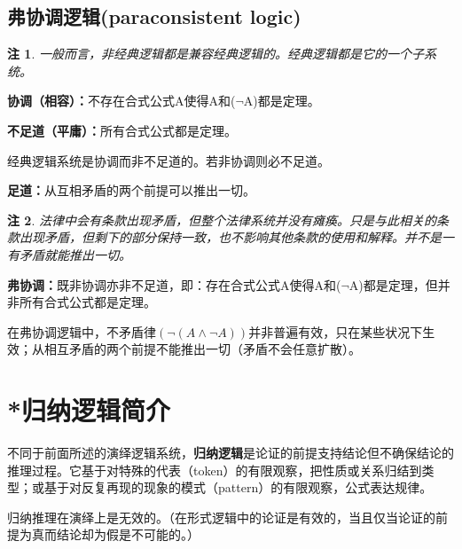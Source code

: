 \documentclass[12pt,onecolumn,a4paper]{book}
\newtheorem*{note}{注}
\numberwithin{table}{subsection}
\numberwithin{equation}{subsection}
\begin{document}
\section{弗协调逻辑(paraconsistent logic)}

\begin{note}
    一般而言，非经典逻辑都是兼容经典逻辑的。经典逻辑都是它的一个子系统。
\end{note}

\textbf{协调（相容）：}不存在合式公式A使得A和($\neg$A)都是定理。

\textbf{不足道（平庸）：}所有合式公式都是定理。

经典逻辑系统是协调而非不足道的。若非协调则必不足道。

\textbf{足道：}从互相矛盾的两个前提可以推出一切。


\begin{note}
    法律中会有条款出现矛盾，但整个法律系统并没有瘫痪。只是与此相关的条款出现矛盾，但剩下的部分保持一致，也不影响其他条款的使用和解释。并不是一有矛盾就能推出一切。
\end{note}

\textbf{弗协调：}既非协调亦非不足道，即：存在合式公式A使得A和($\neg$A)都是定理，但并非所有合式公式都是定理。

在弗协调逻辑中，不矛盾律$(\neg(A\wedge \neg A))$并非普遍有效，只在某些状况下生效；从相互矛盾的两个前提不能推出一切（矛盾不会任意扩散）。

\chapter{*归纳逻辑简介}\label{chap10}

不同于前面所述的演绎逻辑系统，\textbf{归纳逻辑}是论证的前提支持结论但不确保结论的推理过程。它基于对特殊的代表（token）的有限观察，把性质或关系归结到类型；或基于对反复再现的现象的模式（pattern）的有限观察，公式表达规律。

归纳推理在演绎上是无效的。（在形式逻辑中的论证是有效的，当且仅当论证的前提为真而结论却为假是不可能的。）
\end{document}
